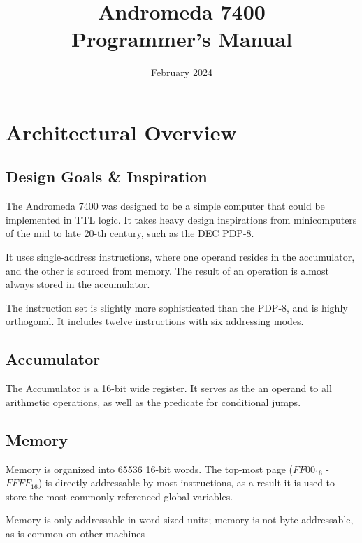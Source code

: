 \documentclass[11pt]{article}
\title{
    Andromeda 7400\\
\large Programmer's Manual}
\date{February 2024}
\begin{document}
    \maketitle

    \pagebreak
    \tableofcontents
    \pagebreak

    \section{Architectural Overview}\label{subsec:archetctural-overview}
    \subsection{Design Goals \& Inspiration}\label{subsec:design-goals-&-inspiration}
    \par The Andromeda 7400 was designed to be a simple computer that could be implemented in TTL logic.
    It takes heavy design inspirations from minicomputers of the mid to late 20-th century, such as the
    DEC PDP-8.
    \par It uses single-address instructions, where one operand resides in the accumulator, and the other is
    sourced from memory.
    The result of an operation is almost always stored in the accumulator.
    \par The instruction set is slightly more sophisticated than the PDP-8, and is highly orthogonal.
    It includes twelve instructions with six addressing modes.

    \subsection{Accumulator}\label{subsec:accumulator}
    \par The Accumulator is a 16-bit wide register.
    It serves as the an operand to all arithmetic operations, as well as the predicate for conditional jumps.

    \subsection{Memory}\label{subsec:memory}
    \par Memory is organized into 65536 16-bit words.
    The top-most page ($FF00_{16}$ - $FFFF_{16}$) is directly addressable by most instructions, as a result it
    is used to store the most commonly referenced global variables.
    \par Memory is only addressable in word sized units; memory is not byte addressable, as is common on other machines
\end{document}

